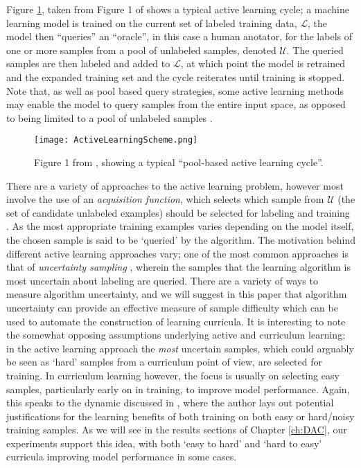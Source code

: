 Figure \ref{ActiveLearningExample}, taken from Figure 1 of \cite{settles2012active} shows a typical active learning cycle; a machine learning model is trained on the current set of labeled training data, $\mathcal{L}$, the model then ``queries'' an ``oracle'', in this case a human anotator, for the labels of one or more samples from a pool of unlabeled  samples, denoted $\mathcal{U}$. The queried samples are then labeled and added to $\mathcal{L}$, at which point the model is retrained and the expanded training set and the cycle reiterates until training is stopped. Note that, as well as pool based query strategies, some active learning methods may enable the model to query samples from the entire input space, as opposed to being limited to a pool of unlabeled samples \cite{settles2012active}.

\begin{figure}[h!]
\centering
\texttt{[image: ActiveLearningScheme.png]}
\caption{Figure 1 from  \cite{settles2012active}, showing a typical ``pool-based active learning cycle''.}
\label{ActiveLearningExample}
\end{figure}

There are a variety of approaches to the active learning problem, however most involve the use of an \textit{acquisition function}, which selects which sample from $\mathcal{U}$ (the set of candidate unlabeled examples) should be selected for labeling and training \cite{settles2012active}. As the most appropriate training examples varies depending on the model itself, the chosen sample is said to be `queried' by the algorithm. The motivation behind different active learning approaches vary; one of the most common approaches is that of \textit{uncertainty sampling} \cite{settles2012active}, wherein the samples that the learning algorithm is most uncertain about labeling are queried. There are a variety of ways to measure algorithm uncertainty, and we will suggest in this paper that algorithm uncertainty can provide an effective measure of sample difficulty which can be used to automate the construction of learning curricula. It is interesting to note the somewhat opposing assumptions underlying active and curriculum learning; in the active learning approach the \textit{most} uncertain samples, which could arguably be seen as `hard' samples from a curriculum point of view, are selected for training. In curriculum learning however, the focus is usually on selecting easy samples, particularly early on in training, to improve model performance. Again, this speaks to the dynamic discussed in \cite{ELMAN199371}, where the author lays out potential justifications for the learning benefits of both training on both easy or hard/noisy training samples. As we will see in the results sections of Chapter \ref{ch:DAC}, our experiments support this idea, with both `easy to hard' and `hard to easy' curricula improving model performance in some cases.


